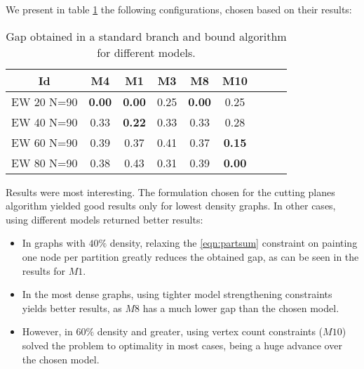 We present in table \ref{table:models:bnb} the following configurations, chosen based on their results:

\begin{itemize}
\end{itemize}

\begin{table}
\label{table:models:bnb}
\centering

\begin{tabular}{|c|c|c|c|c|c|c|c|c|}
\hline
\multicolumn{1}{|c|}{Id} & \multicolumn{1}{|c|}{M4} & \multicolumn{1}{|c|}{M1} & \multicolumn{1}{|c|}{M3}  & \multicolumn{1}{|c|}{M8}  & \multicolumn{1}{|c|}{M10} 
\\
\hline
EW 20 N=90 & \textbf{0.00} & \textbf{0.00} & 0.25  & \textbf{0.00}  & 0.25
\\
EW 40 N=90 & 0.33 & \textbf{0.22} & 0.33 & 0.33 & 0.28 
\\
EW 60 N=90 & 0.39 & 0.37 & 0.41 & 0.37 & \textbf{0.15}
\\
EW 80 N=90 & 0.38 & 0.43 & 0.31 & 0.39 & \textbf{0.00}
\\
\hline 
 \end{tabular}

\caption{Gap obtained in a standard branch and bound algorithm for different models.}

\end{table}

Results were most interesting. The formulation chosen for the cutting planes algorithm yielded good results only for lowest density graphs. In other cases, using different models returned better results:
\begin{itemize}
\item In graphs with $40\%$ density, relaxing the \ref{eqn:partsum} constraint on painting one node per partition greatly reduces the obtained gap, as can be seen in the results for $M1$.
\item In the most dense graphs, using tighter model strengthening constraints yields better results, as $M8$ has a much lower gap than the chosen model.
\item However, in $60\%$ density and greater, using vertex count constraints ($M10$) solved the problem to optimality in most cases, being a huge advance over the chosen model.
\end{itemize}

